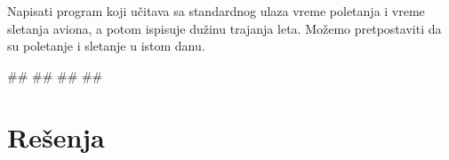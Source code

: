 \begin{Exercise}[label=p1_11] 
Napisati program koji učitava sa standardnog ulaza vreme poletanja i vreme sletanja aviona, a potom ispisuje dužinu trajanja leta. Možemo pretpostaviti da su poletanje i sletanje u istom danu.\\
\begin{miditest}
\begin{upotreba}{1}
#\naslovInt#
##
##
##
\end{upotreba}
\end{miditest}
\end{Exercise}
\begin{Answer}[ref=p1_11]
\end{Answer}

\section{Rešenja}
\shipoutAnswer
